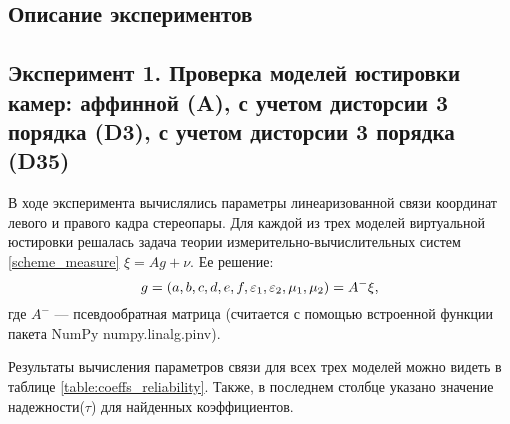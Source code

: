 \begin{center}\section{Описание экспериментов}\end{center}
\subsection{Эксперимент 1. Проверка моделей юстировки камер: аффинной (A), с учетом дисторсии 3 порядка (D3), с учетом дисторсии 3 порядка (D35)}
В ходе эксперимента вычислялись параметры линеаризованной связи координат левого и правого кадра стереопары. Для каждой из трех моделей виртуальной юстировки решалась задача теории измерительно-вычислительных систем \eqref{scheme_measure} $\xi = A g + \nu$. Ее решение:
$$
    g = (a, b, c, d, e, f, \varepsilon_1, \varepsilon_2, \mu_1, \mu_2) = A^- \xi,
$$
где $A^-$ --- псевдообратная матрица (считается с помощью встроенной функции пакета NumPy numpy.linalg.pinv).

Результаты вычисления параметров связи для всех трех моделей можно видеть в таблице \ref{table:coeffs_reliability}.
Также, в последнем столбце указано значение надежности($\tau$) для найденных коэффициентов.



